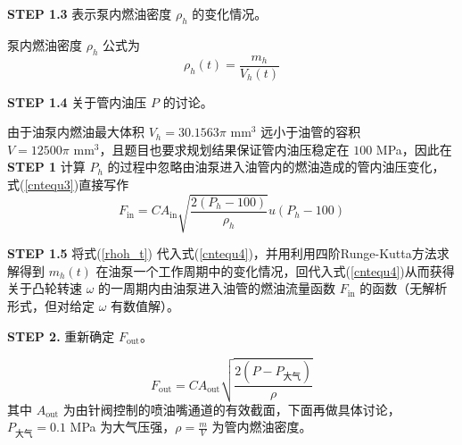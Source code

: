 \documentclass[12pt,a4paper]{article}
\begin{document}
\textbf{\songti STEP 1.3} 表示泵内燃油密度 $\rho_h$ 的变化情况。

泵内燃油密度 $\rho_h$ 公式为
\begin{equation}
\label{rhoh_t}
\rho_h(t)=\frac{m_h}{V_h(t)}
\end{equation}

\textbf{\songti STEP 1.4} 关于管内油压 $P$ 的讨论。

由于油泵内燃油最大体积 $V_h=30.1563\pi\text{ mm}^3$ 远小于油管的容积 $V=12500\pi\text{ mm}^3$，且题目也要求规划结果保证管内油压稳定在 $100$ MPa，因此在\textbf{\songti STEP 1} 计算 $P_{h}$ 的过程中忽略由油泵进入油管内的燃油造成的管内油压变化，式(\ref{cntequ3})直接写作
\begin{equation}
\label{cntequ4}
F_{\text{in}}=CA_{\text{in}}\sqrt{\frac{2(P_h-100)}{\rho_h}}u(P_h-100)
\end{equation}

\textbf{\songti STEP 1.5} 将式(\ref{rhoh_t}) 代入式(\ref{cntequ4})，并用利用四阶Runge-Kutta方法求解得到 $m_h(t)$ 在油泵一个工作周期中的变化情况，回代入式(\ref{cntequ4})从而获得关于凸轮转速 $\omega$ 的一周期内由油泵进入油管的燃油流量函数 $F_{\text{in}}$ 的函数（无解析形式，但对给定 $\omega$ 有数值解）。

\textbf{\songti STEP 2.} 重新确定 $F_{\text{out}}$。

\begin{equation}
\label{Fout3}
F_{\text{out}}=CA_{\text{out}}\sqrt{\frac{2(P-P_{\text{大气}})}{\rho}}
\end{equation}
其中 $A_{\text{out}}$ 为由针阀控制的喷油嘴通道的有效截面，下面再做具体讨论，$P_{\text{大气}}=0.1$ MPa 为大气压强，$\rho=\frac{m}{V}$ 为管内燃油密度。
\end{document}
